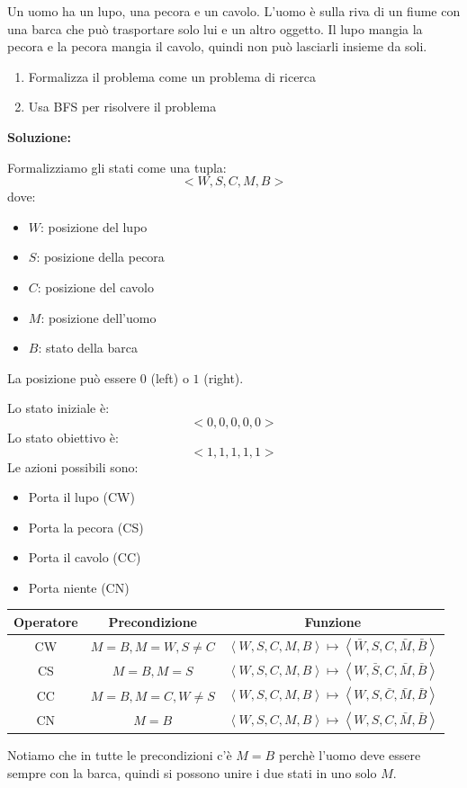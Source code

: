 \documentclass[a4paper]{article}
\begin{document}
{
  Un uomo ha un lupo, una pecora e un cavolo. L'uomo è sulla riva di un fiume con una
  barca che può trasportare solo lui e un altro oggetto. Il lupo mangia la pecora e la
  pecora mangia il cavolo, quindi non può lasciarli insieme da soli.
  \begin{enumerate}
    \item Formalizza il problema come un problema di ricerca
    \item Usa BFS per risolvere il problema
  \end{enumerate}

  \vspace{1em}
  \noindent
  \textbf{Soluzione:}

  Formalizziamo gli stati come una tupla:
  \[
    <W, S, C, M, B>
  \] 
  dove:
  \begin{itemize}
    \item \( W \): posizione del lupo
    \item \( S \): posizione della pecora
    \item \( C \): posizione del cavolo
    \item \( M \): posizione dell'uomo
    \item \( B \): stato della barca
  \end{itemize}
  La posizione può essere \( 0 \) (left) o \( 1 \) (right).

  Lo stato iniziale è:
  \[
    <0, 0, 0, 0, 0>
  \] 
  Lo stato obiettivo è:
  \[
    <1, 1, 1, 1, 1>
  \]
  Le azioni possibili sono:
  \begin{itemize}
    \item Porta il lupo (CW)
    \item Porta la pecora (CS)
    \item Porta il cavolo (CC)
    \item Porta niente (CN)
  \end{itemize}
  \begin{table}[H]
    \centering
    \begin{tabular}{|c|c|c|}
      \hline
      Operatore & Precondizione & Funzione \\
      \hline
      \footnotesize CW & \footnotesize \( M = B, M = W, S \neq C \) & \footnotesize\( \left<W,S,C,M,B\right> \mapsto \left<\bar{W},S,C,\bar{M},\bar{B}\right> \)\\
      \footnotesize CS & \footnotesize \( M = B, M = S \) & \footnotesize\( \left<W,S,C,M,B\right> \mapsto \left<W,\bar{S},C,\bar{M},\bar{B}\right> \)\\
      \footnotesize CC & \footnotesize \( M = B, M = C, W \neq S \) & \footnotesize\( \left<W,S,C,M,B\right> \mapsto \left<W,S,\bar{C},\bar{M},\bar{B}\right> \)\\
      \footnotesize CN & \footnotesize \( M = B \) & \footnotesize\( \left<W,S,C,M,B\right> \mapsto \left<W,S,C,\bar{M},\bar{B}\right> \)\\
      \hline
    \end{tabular}
  \end{table}
  Notiamo che in tutte le precondizioni c'è \( M = B \) perchè l'uomo deve essere
  sempre con la barca, quindi si possono unire i due stati in uno solo \( M \).
}
\end{document}
